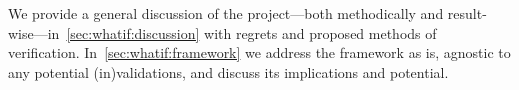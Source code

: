 














We provide a general discussion of the project---both methodically and result-wise---in~\cref{sec:whatif:discussion} with regrets and proposed methods of verification. In~\cref{sec:whatif:framework} we address the framework as is, agnostic to any potential (in)validations, and discuss its implications and potential.



























